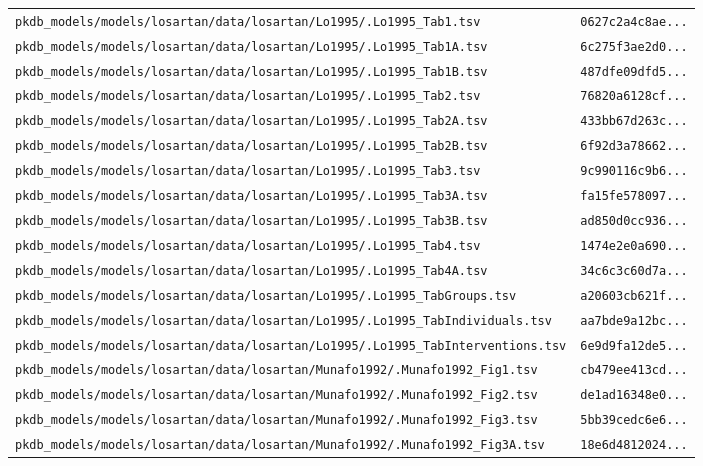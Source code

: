 \begin{longtable}{ll}
\texttt{pkdb\_models/models/losartan/data/losartan/Lo1995/.Lo1995\_Tab1.tsv} & \texttt{0627c2a4c8ae...} \\
\texttt{pkdb\_models/models/losartan/data/losartan/Lo1995/.Lo1995\_Tab1A.tsv} & \texttt{6c275f3ae2d0...} \\
\texttt{pkdb\_models/models/losartan/data/losartan/Lo1995/.Lo1995\_Tab1B.tsv} & \texttt{487dfe09dfd5...} \\
\texttt{pkdb\_models/models/losartan/data/losartan/Lo1995/.Lo1995\_Tab2.tsv} & \texttt{76820a6128cf...} \\
\texttt{pkdb\_models/models/losartan/data/losartan/Lo1995/.Lo1995\_Tab2A.tsv} & \texttt{433bb67d263c...} \\
\texttt{pkdb\_models/models/losartan/data/losartan/Lo1995/.Lo1995\_Tab2B.tsv} & \texttt{6f92d3a78662...} \\
\texttt{pkdb\_models/models/losartan/data/losartan/Lo1995/.Lo1995\_Tab3.tsv} & \texttt{9c990116c9b6...} \\
\texttt{pkdb\_models/models/losartan/data/losartan/Lo1995/.Lo1995\_Tab3A.tsv} & \texttt{fa15fe578097...} \\
\texttt{pkdb\_models/models/losartan/data/losartan/Lo1995/.Lo1995\_Tab3B.tsv} & \texttt{ad850d0cc936...} \\
\texttt{pkdb\_models/models/losartan/data/losartan/Lo1995/.Lo1995\_Tab4.tsv} & \texttt{1474e2e0a690...} \\
\texttt{pkdb\_models/models/losartan/data/losartan/Lo1995/.Lo1995\_Tab4A.tsv} & \texttt{34c6c3c60d7a...} \\
\texttt{pkdb\_models/models/losartan/data/losartan/Lo1995/.Lo1995\_TabGroups.tsv} & \texttt{a20603cb621f...} \\
\texttt{pkdb\_models/models/losartan/data/losartan/Lo1995/.Lo1995\_TabIndividuals.tsv} & \texttt{aa7bde9a12bc...} \\
\texttt{pkdb\_models/models/losartan/data/losartan/Lo1995/.Lo1995\_TabInterventions.tsv} & \texttt{6e9d9fa12de5...} \\
\texttt{pkdb\_models/models/losartan/data/losartan/Munafo1992/.Munafo1992\_Fig1.tsv} & \texttt{cb479ee413cd...} \\
\texttt{pkdb\_models/models/losartan/data/losartan/Munafo1992/.Munafo1992\_Fig2.tsv} & \texttt{de1ad16348e0...} \\
\texttt{pkdb\_models/models/losartan/data/losartan/Munafo1992/.Munafo1992\_Fig3.tsv} & \texttt{5bb39cedc6e6...} \\
\texttt{pkdb\_models/models/losartan/data/losartan/Munafo1992/.Munafo1992\_Fig3A.tsv} & \texttt{18e6d4812024...} \\

\end{longtable}
